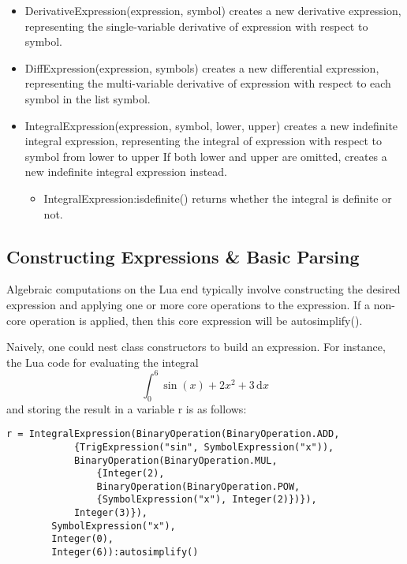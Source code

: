 \documentclass{article}
\begin{document}
\begin{itemize}
    \item {\ttfamily DerivativeExpression(expression, symbol)} creates a new derivative expression, representing the single-variable derivative of {\ttfamily expression} with respect to {\ttfamily symbol}. 
    
    \item {\ttfamily DiffExpression(expression, symbols)} creates a new differential expression, representing the multi-variable derivative of {\ttfamily expression} with respect to each symbol in the list {\ttfamily symbol}.
    
    \item {\ttfamily IntegralExpression(expression, symbol, lower, upper)} creates a new indefinite integral expression, representing the integral of {\ttfamily expression} with respect to {\ttfamily symbol} from {\ttfamily lower} to {\ttfamily upper} If both {\ttfamily lower} and {\ttfamily upper} are omitted, creates a new indefinite integral expression instead.
    \begin{itemize}
        \item {\ttfamily IntegralExpression:isdefinite()} returns whether the integral is definite or not.
    \end{itemize}
\end{itemize}

\subsection{Constructing Expressions \& Basic Parsing}

Algebraic computations on the Lua end typically involve constructing the desired expression and applying one or more core operations to the expression. If a non-core operation is applied, then this core expression will be {\ttfamily autosimplify()}.

Naively, one could nest class constructors to build an expression. For instance, the Lua code for evaluating the integral \[ \int_0^6 \sin(x) + 2x^2 + 3 \hspace{2pt}\mathrm{d}x\] and storing the result in a variable {\ttfamily r} is as follows:

\begin{verbatim}
r = IntegralExpression(BinaryOperation(BinaryOperation.ADD,
            {TrigExpression("sin", SymbolExpression("x")),
            BinaryOperation(BinaryOperation.MUL,
                {Integer(2),
                BinaryOperation(BinaryOperation.POW,
                {SymbolExpression("x"), Integer(2)})}),
            Integer(3)}),
        SymbolExpression("x"),
        Integer(0),
        Integer(6)):autosimplify()
\end{verbatim}
\end{document}
